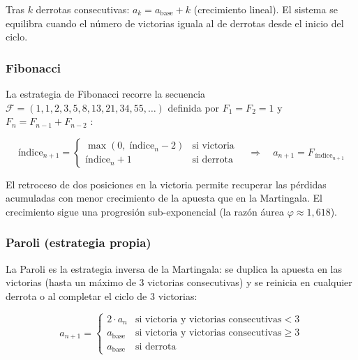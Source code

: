 \documentclass[a4paper, 11pt]{article}
\begin{document}
Tras $k$ derrotas consecutivas: $a_k = a_{\text{base}} + k$ (crecimiento lineal).
El sistema se equilibra cuando el número de victorias iguala al de derrotas
desde el inicio del ciclo.

\subsubsection{Fibonacci}
\label{sec:fibonacci}

La estrategia de Fibonacci recorre la secuencia
$\mathcal{F} = (1, 1, 2, 3, 5, 8, 13, 21, 34, 55, \ldots)$
definida por $F_1 = F_2 = 1$ y $F_n = F_{n-1} + F_{n-2}$
\cite{wikipedia_fibonacci_bet}:

\begin{equation}
  \text{índice}_{n+1} =
  \begin{cases}
    \max(0,\; \text{índice}_n - 2) & \text{si victoria} \\
    \text{índice}_n + 1             & \text{si derrota}
  \end{cases}
  \quad \Longrightarrow \quad a_{n+1} = F_{\,\text{índice}_{n+1}}
  \label{eq:fibonacci}
\end{equation}

El retroceso de dos posiciones en la victoria permite recuperar las pérdidas
acumuladas con menor crecimiento de la apuesta que en la Martingala. El
crecimiento sigue una progresión sub-exponencial (la razón áurea $\varphi
\approx 1{,}618$).

\subsubsection{Paroli (estrategia propia)}
\label{sec:paroli}

La Paroli es la estrategia inversa de la Martingala: se duplica la apuesta
en las victorias (hasta un máximo de 3 victorias consecutivas) y se reinicia
en cualquier derrota o al completar el ciclo de 3 victorias:

\begin{equation}
  a_{n+1} =
  \begin{cases}
    2 \cdot a_n        & \text{si victoria y victorias consecutivas} < 3 \\
    a_{\text{base}}    & \text{si victoria y victorias consecutivas} \geq 3 \\
    a_{\text{base}}    & \text{si derrota}
  \end{cases}
  \label{eq:paroli}
\end{equation}
\end{document}
